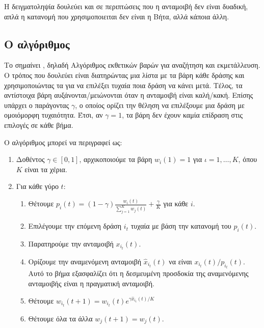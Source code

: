 Η δειγματοληψία  δουλεύει και σε περιπτώσεις που η ανταμοιβή δεν είναι δυαδική, απλά η κατανομή που χρησιμοποιειται δεν είναι η Βήτα, αλλά κάποια άλλη.

\subsection{Ο αλγόριθμος }

Το  σημαίνει , δηλαδή Αλγόριθμος εκθετικών βαρών για αναζήτηση και εκμετάλλευση. Ο τρόπος που δουλεύει είναι διατηρώντας μια λίστα με τα βάρη κάθε δράσης και χρησιμοποιώντας τα για να επιλέξει τυχαία ποια δράση να κάνει μετά. Τέλος, τα αντίστοιχα βάρη αυξάνονται/μειώνονται όταν η ανταμοιβή είναι καλή/κακή. Επίσης υπάρχει ο παράγοντας $γ$, ο οποίος ορίζει την θέληση να επιλέξουμε μια δράση με ομοιόμορφη τυχαιότητα. Έτσι, αν $γ=1$, τα βάρη δεν έχουν καμία επίδραση στις επιλογές σε κάθε βήμα.

Ο αλγόριθμος μπορεί να περιγραφεί ως:
\begin{enumerate}
    \item Δοθέντος $γ \in [0,1]$, αρχικοποιούμε τα βάρη $w_i(1)=1$ για $ι = 1,\ldots,K$, όπου $K$ είναι τα χέρια.
    \item Για κάθε γύρο $t$:
          \begin{enumerate}
              \item Θέτουμε $p_i(t) = (1-γ)\frac{w_i(t)}{\sum_{j=1}^K w_j(t)} + \frac{γ}{K}$ για κάθε $i$.
              \item Επιλέγουμε την επόμενη δράση $i_t$ τυχαία με βάση την κατανομή του $p_i(t)$.
              \item Παρατηρούμε την ανταμοιβή $x_{i_t}(t)$.
              \item Ορίζουμε την αναμενόμενη ανταμοιβή $\hat{x}_{i_t}(t)$ να είναι $x_{i_t}(t)/p_{i_t}(t)$. Αυτό το βήμα εξασφαλίζει ότι η δεσμευμένη προσδοκία της αναμενόμενης ανταμοιβής είναι η πραγματική ανταμοιβή.
              \item Θέτουμε $w_{i_t}(t+1) = w_{i_t}(t)e^{γ\hat{x}_{i_t}(t)/K}$
              \item Θέτουμε όλα τα άλλα $w_j(t+1) = w_j(t)$.
          \end{enumerate}
\end{enumerate}


